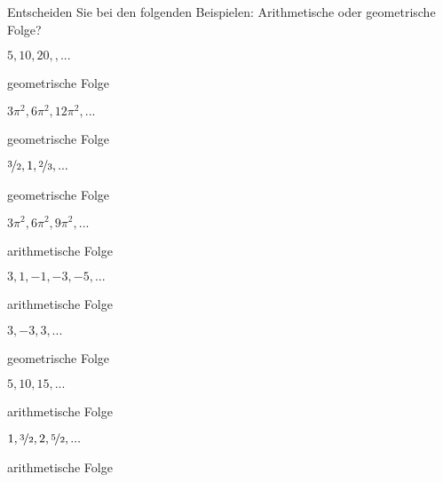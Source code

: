 \begin{exercisesK}

\noindent 
Entscheiden Sie bei den folgenden Beispielen: Arithmetische oder geometrische Folge?

\twocol

\begin{exercise} $5,10,20,,... $
\begin{answer} geometrische Folge
\end{answer}
\end{exercise}

\begin{exercise} $3 \pi^{2}, 6 \pi^{2}, 12 \pi^{2},...$
\begin{answer} geometrische Folge
\end{answer}
\end{exercise}

\begin{exercise} $\nicefrac{3}{2}, 1 ,\nicefrac{2}{3}, ... $
\begin{answer} geometrische Folge
\end{answer}
\end{exercise}

\begin{exercise} $ 3 \pi^{2}, 6 \pi^{2}, 9 \pi^{2},...$
\begin{answer}  arithmetische Folge
\end{answer}
\end{exercise}

\begin{exercise} $ 3,1,-1,-3,-5,...$
\begin{answer}  arithmetische Folge
\end{answer}
\end{exercise}

\begin{exercise} $ 3,-3,3,... $
\begin{answer}  geometrische Folge
\end{answer}
\end{exercise}

\begin{exercise} $ 5,10,15,...$
\begin{answer}  arithmetische Folge
\end{answer}
\end{exercise}

\begin{exercise} $  1, \nicefrac{3}{2}, 2, \nicefrac{5}{2}, ...$
\begin{answer}  arithmetische Folge
\end{answer}
\end{exercise}


\end{exercisesK}
